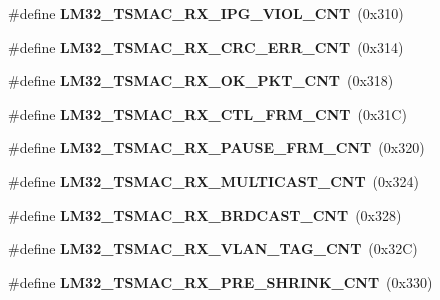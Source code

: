\begin{DoxyCompactItemize}
\item 
\mbox{\label{group__lm32__tsmac_ga07b7060eac8c2b3af428c1ccd7f2e7b0}} 
\#define {\bfseries L\+M32\+\_\+\+T\+S\+M\+A\+C\+\_\+\+R\+X\+\_\+\+I\+P\+G\+\_\+\+V\+I\+O\+L\+\_\+\+C\+NT}~(0x310)
\item 
\mbox{\label{group__lm32__tsmac_gac48c382323efa52a8bdbbc4bdc675fe5}} 
\#define {\bfseries L\+M32\+\_\+\+T\+S\+M\+A\+C\+\_\+\+R\+X\+\_\+\+C\+R\+C\+\_\+\+E\+R\+R\+\_\+\+C\+NT}~(0x314)
\item 
\mbox{\label{group__lm32__tsmac_gaabb8ceea4bcfe1a048c29fb54bbf107a}} 
\#define {\bfseries L\+M32\+\_\+\+T\+S\+M\+A\+C\+\_\+\+R\+X\+\_\+\+O\+K\+\_\+\+P\+K\+T\+\_\+\+C\+NT}~(0x318)
\item 
\mbox{\label{group__lm32__tsmac_ga727ef62fcd5d0fc46b339192afeaf6b4}} 
\#define {\bfseries L\+M32\+\_\+\+T\+S\+M\+A\+C\+\_\+\+R\+X\+\_\+\+C\+T\+L\+\_\+\+F\+R\+M\+\_\+\+C\+NT}~(0x31\+C)
\item 
\mbox{\label{group__lm32__tsmac_gabc97f31ad1a88087765d0bfd27b5bbd3}} 
\#define {\bfseries L\+M32\+\_\+\+T\+S\+M\+A\+C\+\_\+\+R\+X\+\_\+\+P\+A\+U\+S\+E\+\_\+\+F\+R\+M\+\_\+\+C\+NT}~(0x320)
\item 
\mbox{\label{group__lm32__tsmac_ga60002ee5d77c45b02e4336bb45d5d997}} 
\#define {\bfseries L\+M32\+\_\+\+T\+S\+M\+A\+C\+\_\+\+R\+X\+\_\+\+M\+U\+L\+T\+I\+C\+A\+S\+T\+\_\+\+C\+NT}~(0x324)
\item 
\mbox{\label{group__lm32__tsmac_gae82d049d0d3c4bccf9d0ec42cfc1bc6a}} 
\#define {\bfseries L\+M32\+\_\+\+T\+S\+M\+A\+C\+\_\+\+R\+X\+\_\+\+B\+R\+D\+C\+A\+S\+T\+\_\+\+C\+NT}~(0x328)
\item 
\mbox{\label{group__lm32__tsmac_ga23f81fbc0917343a9a5850bce10c93e2}} 
\#define {\bfseries L\+M32\+\_\+\+T\+S\+M\+A\+C\+\_\+\+R\+X\+\_\+\+V\+L\+A\+N\+\_\+\+T\+A\+G\+\_\+\+C\+NT}~(0x32\+C)
\item 
\mbox{\label{group__lm32__tsmac_ga693804401c2852f9dc4195418c217268}} 
\#define {\bfseries L\+M32\+\_\+\+T\+S\+M\+A\+C\+\_\+\+R\+X\+\_\+\+P\+R\+E\+\_\+\+S\+H\+R\+I\+N\+K\+\_\+\+C\+NT}~(0x330)

\end{DoxyCompactItemize}
